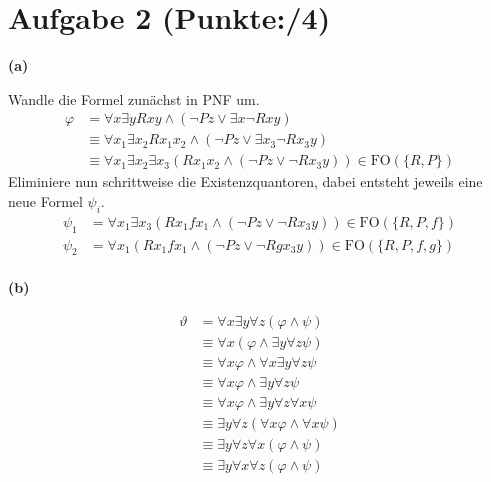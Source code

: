 \documentclass[11pt, a4paper]{article}
\newcommand{\p}{4}
\begin{document}
\section*{Aufgabe 2 (Punkte:\qquad/\p)}
\textbf{(a)}
\begin{adjustwidth}{20pt}{20pt}
Wandle die Formel zunächst in PNF um.
\begin{align*}
	\varphi &= \forall x \exists yRxy \wedge (\neg Pz \vee \exists x\neg Rxy) \\
		&\equiv \forall x_1 \exists x_2Rx_1x_2 \wedge (\neg Pz \vee \exists x_3\neg Rx_3y)\\
		&\equiv \forall x_1 \exists x_2 \exists x_3(Rx_1x_2 \wedge(\neg Pz \vee \neg Rx_3y)) \in \text{FO}(\{ R,P\})
\end{align*}
Eliminiere nun schrittweise die Existenzquantoren, dabei entsteht jeweils eine neue Formel $\psi_i$.
\begin{align*}
	\psi_1 &= \forall x_1 \exists x_3(Rx_1fx_1 \wedge (\neg Pz \vee \neg Rx_3y))  \in \text{FO}(\{ R,P, f\}) \\
	\psi_2 &= \forall x_1(Rx_1fx_1 \wedge (\neg Pz \vee \neg Rgx_3y))  \in \text{FO}(\{ R,P,f,g\}) \\
\end{align*}
\end{adjustwidth}
\textbf{(b)}
\begin{adjustwidth}{20pt}{20pt}\vspace{-\baselineskip}
\begin{align*}
	\vartheta &= \forall x\exists y \forall z(\varphi \wedge \psi) \\
		&\equiv \forall x(\varphi \wedge \exists y \forall z \psi) \\
		&\equiv \forall x \varphi \wedge \forall x\exists y \forall z \psi \\
		&\equiv \forall x \varphi \wedge \exists y \forall z \psi \\
		&\equiv \forall x \varphi \wedge \exists y \forall z \forall x \psi \\
		&\equiv \exists y \forall z(\forall x \varphi \wedge \forall x \psi) \\
		&\equiv \exists y\forall z \forall x(\varphi \wedge \psi) \\
		&\equiv \exists y\forall x \forall z(\varphi \wedge \psi)
\end{align*}
\end{adjustwidth}
\end{document}
